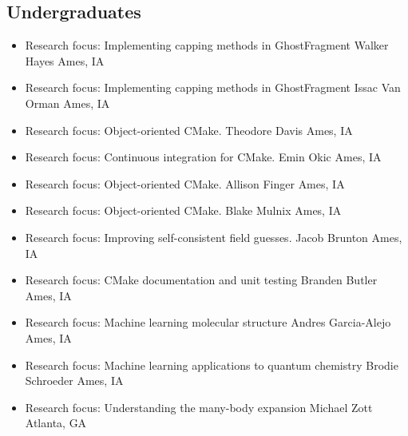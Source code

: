 \documentclass[11pt,a4paper,sans]{moderncv}
\begin{document}
\subsection{Undergraduates}
\begin{itemize}
	\item{
		{Research focus: Implementing capping methods in GhostFragment}
		{Walker Hayes}
		{Ames, IA}
		{}{}
	}
	\item{
		{Research focus: Implementing capping methods in GhostFragment}
		{Issac Van Orman}
		{Ames, IA}
		{}{}
	}
	\item{
		{Research focus: Object-oriented CMake.}
		{Theodore Davis}
		{Ames, IA}
		{}{}
	}
	\item{
		{Research focus: Continuous integration for CMake.}
		{Emin Okic}
		{Ames, IA}
		{}{}
	}
	\item{
		{Research focus: Object-oriented CMake.}
		{Allison Finger}
		{Ames, IA}
		{}{}
	}
	\item{
		{Research focus: Object-oriented CMake.}
		{Blake Mulnix}
		{Ames, IA}
		{}{}
	}
	\item{
		{Research focus: Improving self-consistent field guesses.}
		{Jacob Brunton}
		{Ames, IA}
		{}{}
	}
	\item{
		{Research focus: CMake documentation and unit testing}
		{Branden Butler}
		{Ames, IA}
		{}{}
	}
	\item{
		{Research focus: Machine learning molecular structure}
		{Andres Garcia-Alejo}
		{Ames, IA}
		{}{}
	}
	\item{
		{Research focus: Machine learning applications to quantum chemistry}
		{Brodie Schroeder}
		{Ames, IA}
		{}{}
	}
	\item{
		{Research focus: Understanding the many-body expansion}
		{Michael Zott}
		{Atlanta, GA}
		{}{}
	}
\end{itemize}
\end{document}
